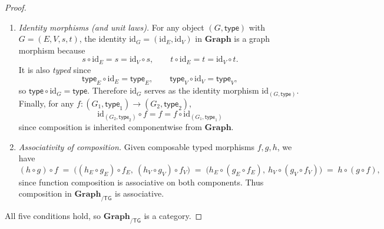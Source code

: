\documentclass[11pt]{article}
\theoremstyle{definition}
\newcommand{\cat}[1]{\mathbf{#1}}
\newcommand{\Graph}{\cat{Graph}}
\newcommand{\id}{\mathrm{id}}
\begin{document}
\begin{proof}
\begin{enumerate}[label=\textbf{(\arabic*)}, leftmargin=2.2em]
\emph{(b) $g\circ f$ preserves typing.}
We must show $\mathsf{type}_3\circ(g\circ f)=\mathsf{type}_1$ as morphisms $G_1\to \mathsf{TG}$,
i.e.\ both on edges and on vertices:
\[
  \mathsf{type}_{3,E}\circ(g_E\circ f_E)
  \;=\;
  (\mathsf{type}_{3,E}\circ g_E)\circ f_E
  \;=\;
  \mathsf{type}_{2,E}\circ f_E
  \;=\;
  \mathsf{type}_{1,E},
\]
since $g$ is typed ($\mathsf{type}_3\circ g=\mathsf{type}_2$) and $f$ is typed
($\mathsf{type}_2\circ f=\mathsf{type}_1$). The same argument holds for vertices:
\[
  \mathsf{type}_{3,V}\circ(g_V\circ f_V)
  \;=\;
  (\mathsf{type}_{3,V}\circ g_V)\circ f_V
  \;=\;
  \mathsf{type}_{2,V}\circ f_V
  \;=\;
  \mathsf{type}_{1,V}.
\]
Hence $g\circ f$ is a well-typed morphism $(G_1,\mathsf{type}_1)\to(G_3,\mathsf{type}_3)$.

\item \emph{Identity morphisms (and unit laws).}
For any object $(G,\mathsf{type})$ with $G=(E,V,s,t)$,
the identity $\id_G=(\id_E,\id_V)$ in $\Graph$ is a graph morphism because
\[
  s\circ \id_E = s = \id_V\circ s,
  \qquad
  t\circ \id_E = t = \id_V\circ t.
\]
It is also \emph{typed} since
\[
  \mathsf{type}_E\circ \id_E = \mathsf{type}_E,
  \qquad
  \mathsf{type}_V\circ \id_V = \mathsf{type}_V,
\]
so $\mathsf{type}\circ \id_G=\mathsf{type}$.
Therefore $\id_G$ serves as the identity morphism $\id_{(G,\mathsf{type})}$.
Finally, for any $f:(G_1,\mathsf{type}_1)\to(G_2,\mathsf{type}_2)$,
\[
  \id_{(G_2,\mathsf{type}_2)}\circ f = f = f\circ \id_{(G_1,\mathsf{type}_1)}
\]
since composition is inherited componentwise from $\Graph$.

\item \emph{Associativity of composition.}
Given composable typed morphisms $f,g,h$, we have
\[
  (h\circ g)\circ f
  \;=\;
  \big((h_E\circ g_E)\circ f_E,\ (h_V\circ g_V)\circ f_V\big)
  \;=\;
  \big(h_E\circ(g_E\circ f_E),\ h_V\circ(g_V\circ f_V)\big)
  \;=\;
  h\circ(g\circ f),
\]
since function composition is associative on both components.
Thus composition in $\Graph_{/\mathsf{TG}}$ is associative.
\end{enumerate}

All five conditions hold, so $\Graph_{/\mathsf{TG}}$ is a category.
\end{proof}
\end{document}
